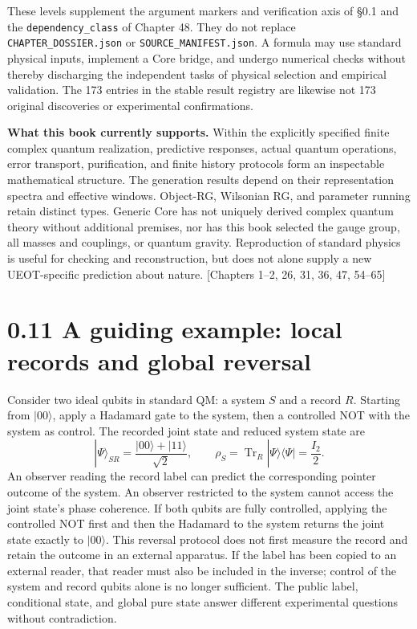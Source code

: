 \documentclass[
  11pt,
  oneside]{book}
\begin{document}
These levels supplement the argument markers and verification axis of
§0.1 and the \texttt{dependency\_\allowbreak class} of Chapter 48. They do not
replace \texttt{CHAPTER\_\allowbreak DOSSIER.\allowbreak json} or
\texttt{SOURCE\_\allowbreak MANIFEST.\allowbreak json}. A formula may use standard physical
inputs, implement a Core bridge, and undergo numerical checks without
thereby discharging the independent tasks of physical selection and
empirical validation. The 173 entries in the stable result registry are
likewise not 173 original discoveries or experimental confirmations.

\textbf{What this book currently supports.} Within the explicitly
specified finite complex quantum realization, predictive responses,
actual quantum operations, error transport, purification, and finite
history protocols form an inspectable mathematical structure. The
generation results depend on their representation spectra and effective
windows. Object-RG, Wilsonian RG, and parameter running retain distinct
types. Generic Core has not uniquely derived complex quantum theory
without additional premises, nor has this book selected the gauge group,
all masses and couplings, or quantum gravity. Reproduction of standard
physics is useful for checking and reconstruction, but does not alone
supply a new UEOT-specific prediction about nature. {[}Chapters 1--2,
26, 31, 36, 47, 54--65{]}

\section{0.11 A guiding example: local records and global reversal}

Consider two ideal qubits in standard QM: a system \(S\) and a record
\(R\). Starting from \(|00\rangle\), apply a Hadamard gate to the
system, then a controlled NOT with the system as control. The recorded
joint state and reduced system state are \[
|\Psi\rangle_{SR}=\frac{|00\rangle+|11\rangle}{\sqrt2},
\qquad
\rho_S=\operatorname{Tr}_R|\Psi\rangle\langle\Psi|=\frac{I_2}{2}.
\] An observer reading the record label can predict the corresponding
pointer outcome of the system. An observer restricted to the system
cannot access the joint state's phase coherence. If both qubits are
fully controlled, applying the controlled NOT first and then the
Hadamard to the system returns the joint state exactly to
\(|00\rangle\). This reversal protocol does not first measure the record
and retain the outcome in an external apparatus. If the label has been
copied to an external reader, that reader must also be included in the
inverse; control of the system and record qubits alone is no longer
sufficient. The public label, conditional state, and global pure state
answer different experimental questions without contradiction.
\end{document}
